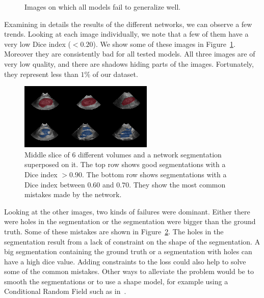 \begin{figure}
\begin{subfigure}{.33\textwidth}
\end{subfigure}
\caption{Images on which all models fail to generalize well.}
\label{fig:bad_images}
\end{figure}

Examining in details the results of the different networks, we can observe a few trends. 
Looking at each image individually, we note that a few of them have a very low Dice index ($< 0.20$). We show some of these images in Figure~\ref{fig:bad_images}. Moreover they are consistently bad for all tested models. All three images are of very low quality, and there are shadows hiding parts of the images. Fortunately, they represent less than $1 \%$ of our dataset.

\begin{figure}
	\includegraphics[width=\textwidth]{img_transfer/seg_good_bad}
    \caption{Middle slice of 6 different volumes and a network segmentation superposed on it. The top row shows good segmentations with a Dice index $> 0.90$. The bottom row shows segmentations with a Dice index between $0.60$ and $0.70$. They show the most common mistakes made by the network.}
    \label{fig:mseg}
\end{figure}

Looking at the other images, two kinds of failures were dominant. Either there were holes in the segmentation or the segmentation were bigger than the ground truth. Some of these mistakes are shown in Figure~\ref{fig:mseg}. The holes in the segmentation result from a lack of constraint on the shape of the segmentation. A big segmentation containing the ground truth or a segmentation with holes can have a high dice value. Adding constraints to the loss could also help to solve some of the common mistakes. Other ways to alleviate the problem would be to smooth the segmentations or to use a shape model, for example using a Conditional Random Field such as in~\textcite{kamnitsas2017MEDIA}.

